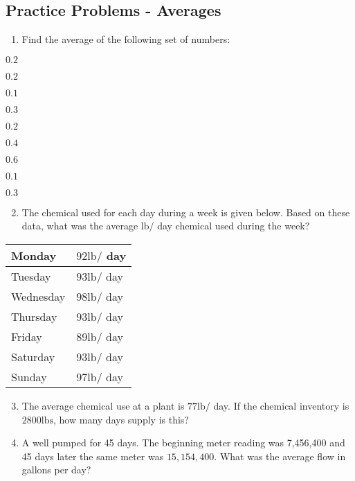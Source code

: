 \documentclass[10pt]{article}
\begin{document}
\begin{enumerate}
\begin{enumerate}
\section{Practice Problems - Averages}
\begin{enumerate}
  \item Find the average of the following set of numbers:
\end{enumerate}

$0.2$

$0.2$

$0.1$

$0.3$

$0.2$

$0.4$

$0.6$

$0.1$

$0.3$

\begin{enumerate}
  \setcounter{enumi}{1}
  \item The chemical used for each day during a week is given below. Based on these data, what was the average $\mathrm{lb} /$ day chemical used during the week?
\end{enumerate}

\begin{center}
\begin{tabular}{|l|l|}
\hline
Monday & $92 \mathrm{lb} /$ day \\
\hline
Tuesday & $93 \mathrm{lb} /$ day \\
\hline
Wednesday & $98 \mathrm{lb} /$ day \\
\hline
Thursday & $93 \mathrm{lb} /$ day \\
\hline
Friday & $89 \mathrm{lb} /$ day \\
\hline
Saturday & $93 \mathrm{lb} /$ day \\
\hline
Sunday & $97 \mathrm{lb} /$ day \\
\hline
\end{tabular}
\end{center}

\begin{enumerate}
  \setcounter{enumi}{2}
  \item The average chemical use at a plant is $77 \mathrm{lb} /$ day. If the chemical inventory is $2800 \mathrm{lbs}$, how many days supply is this?

  \item A well pumped for 45 days. The beginning meter reading was 7,456,400 and 45 days later the same meter was $15,154,400$. What was the average flow in gallons per day?


\end{enumerate}
\end{enumerate}
\end{enumerate}
\end{document}
